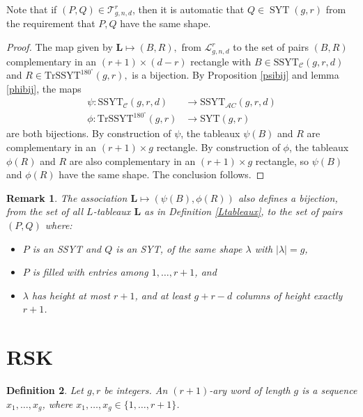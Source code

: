 \documentclass[12pt]{amsart}
\def\cL{\mathcal{L}}
\def\cT{\mathcal{T}}
\def\bL{\mathbf{L}}
\DeclareMathOperator{\SYT}{SYT}
\newtheorem{definition}{Definition}[section]
\newtheorem{remark}[definition]{Remark}
\begin{document}
Note that if $(P,Q)\in \cT_{g,n,d}^r$, then it is automatic that $Q\in \SYT(g,r)$ from the requirement that $P,Q$ have the same shape.

\begin{proof}
The map given by $\bL \mapsto (B,R),$ from $\cL^{r}_{g,n,d}$ to the set of pairs $(B,R)$ complementary in an $(r+1)\times (d-r)$ rectangle with $B\in \text{SSYT}_{\mathcal C}(g,r,d)$ and $R\in \text{TrSSYT}^{180^\circ}(g,r),$ is a bijection. By Proposition \ref{psibij} and lemma \ref{phibij}, the maps
\begin{align*}
    \psi:\text{SSYT}_{\mathcal C}(g,r,d)&\rightarrow \text{SSYT}_{\mathcal AC}(g,r,d)\\
    \phi:\text{TrSSYT}^{180^\circ}(g,r)&\rightarrow \text{SYT}(g,r)
\end{align*}
are both bijections. By construction of $\psi$, the tableaux $\psi(B)$ and $R$ are complementary in an $(r+1)\times g$ rectangle. By construction of $\phi$, the tableaux $\phi(R)$ and $R$ are also complementary in an $(r+1)\times g$ rectangle, so $\psi(B)$ and $\phi(R)$ have the same shape. The conclusion follows.
\end{proof}

\begin{remark}
The association $\bL\mapsto (\psi(B),\phi(R))$ also defines a bijection, from the set of all $L$-tableaux $\bL$ as in Definition \ref{Ltableaux}, to the set of pairs $(P,Q)$ where:
\begin{itemize}
    \item $P$ is an SSYT and $Q$ is an SYT, of the same shape $\lambda$ with $|\lambda|=g$,
    \item $P$ is filled with entries among $1,\ldots,r+1$, and
    \item $\lambda$ has height at most $r+1$, and at least $g+r-d$ columns of height exactly $r+1$.
\end{itemize}
\end{remark}



\section{RSK}\label{sec:rsk}

\begin{definition}\label{def:word}
   Let $g,r$ be integers. An \emph{$(r+1)$-ary word of length $g$} is a sequence $x_1,\ldots,x_g$, where $x_1,\ldots,x_g\in\{1,\ldots,r+1\}$. 
\end{definition}
\end{document}
